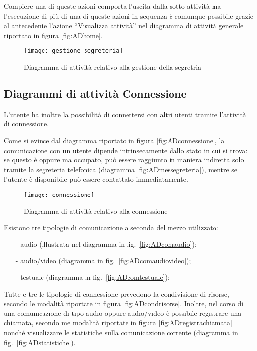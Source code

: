 Compiere una di queste azioni comporta l'uscita dalla sotto-attività ma l'esecuzione di più di una di queste azioni in sequenza è comunque possibile grazie al  antecedente l'azione ``Visualizza attività'' nel diagramma di attività generale riportato in figura \vref{fig:ADhome}.

\begin{figure}[H]
\centering
\texttt{[image: gestione\_segreteria]}
\caption{Diagramma di attività relativo alla gestione della segretria}\label{fig:ADgestionesegreteria}
\end{figure}

\subsection{Diagrammi di attività Connessione}
L'utente ha inoltre la possibilità di connettersi con altri utenti tramite l'attività di connessione.

Come si evince dal diagramma riportato in figura \vref{fig:ADconnessione}, la comunicazione con un utente dipende intrinsecamente dallo stato in cui si trova: se questo è  oppure  ma occupato, può essere raggiunto in maniera indiretta solo tramite la segreteria telefonica (diagramma \ref{fig:ADmessegreteria}), mentre se l'utente è disponibile può essere contattato immediatamente.

\begin{figure}[H]
\centering
\texttt{[image: connessione]}
\caption{Diagramma di attività relativo alla connessione}\label{fig:ADconnessione}
\end{figure}

Esistono tre tipologie di comunicazione a seconda del mezzo utilizzato:
\begin{itemize}[noitemsep,nolistsep]
  \item[-] audio (illustrata nel diagramma in fig.~\ref{fig:ADcomaudio});
  \item[-] audio/video (diagramma in fig.~\ref{fig:ADcomaudiovideo});
  \item[-] testuale (diagramma in fig.~\ref{fig:ADcomtestuale});
\end{itemize}


Tutte e tre le tipologie di connessione prevedono la condivisione di risorse, secondo le modalità riportate in figura \ref{fig:ADcondrisorse}. Inoltre, nel corso di una comunicazione di tipo audio oppure audio/video è possibile registrare una chiamata, secondo me modalità riportate in figura \ref{fig:ADregistrachiamata} nonché visualizzare le statistiche sulla comunicazione corrente (diagramma in fig.~\vref{fig:ADstatistiche}).


